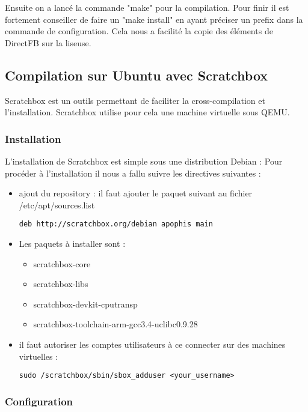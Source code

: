 Ensuite on a lancé la commande "make" pour la compilation. Pour finir il est fortement conseiller de faire un "make install" en ayant préciser un prefix dans la commande de configuration. Cela nous a facilité la copie des éléments de DirectFB sur la liseuse. 

\newpage

\subsection{Compilation sur Ubuntu avec Scratchbox}

Scratchbox est un outils permettant de faciliter la cross-compilation et l'installation. Scratchbox utilise pour cela une machine virtuelle sous QEMU.

\subsubsection{Installation}

L'installation de Scratchbox est simple sous une distribution Debian : 
Pour procéder à l'installation il nous a fallu suivre les directives suivantes :
\begin{itemize}
	\item ajout du repository :
		il faut ajouter le paquet suivant au fichier /etc/apt/sources.list
		\begin{lstlisting}
deb http://scratchbox.org/debian apophis main
		\end{lstlisting}
	\item 
		Les paquets à installer sont :
			\begin{itemize}
				\item scratchbox-core
				\item scratchbox-libs
				\item scratchbox-devkit-cputransp
				\item scratchbox-toolchain-arm-gcc3.4-uclibc0.9.28
			\end{itemize}
	\item il faut autoriser les comptes utilisateurs à ce connecter sur des machines virtuelles : 
	\begin{lstlisting}
sudo /scratchbox/sbin/sbox_adduser <your_username>
	\end{lstlisting}	
\end{itemize}

\subsubsection{Configuration}

